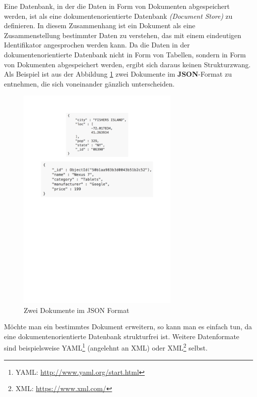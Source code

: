 Eine Datenbank, in der die Daten in Form von Dokumenten abgespeichert werden, ist als eine dokumentenorientierte Datenbank \textit{(Document Store)} zu definieren. In diesem Zusammenhang ist ein Dokument als eine Zusammenstellung bestimmter Daten zu verstehen, das mit einem eindeutigen Identifikator angesprochen werden kann. Da die Daten in der dokumentenorientierte Datenbank nicht in Form von Tabellen, sondern in Form von Dokumenten abgespeichert werden, ergibt sich daraus keinen Strukturzwang. Als Beispiel ist aus der Abbildung \ref{img:dodb} zwei Dokumente im \textbf{JSON}-Format zu entnehmen, die sich voneinander gänzlich unterscheiden.
\begin{figure}[H]
\centering
\includegraphics[trim = 0mm 150mm 0mm 20mm, clip, width=0.7\textwidth]{resources/dodb}
\caption[Zwei Dokumente im JSON Format]{Zwei Dokumente im JSON Format}
\label{img:dodb}
\end{figure}
Möchte man ein bestimmtes Dokument erweitern, so kann man es einfach tun, da eine dokumentenorientierte Datenbank strukturfrei ist. Weitere Datenformate sind beispielsweise YAML\footnote{YAML: \url{http://www.yaml.org/start.html}} (angelehnt an XML) oder XML\footnote{XML: \url{https://www.xml.com/}} selbst.

